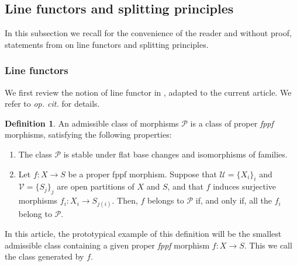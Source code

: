 \documentclass[11pt]{article}
\theoremstyle{plain}
\theoremstyle{definition}
\newtheorem{definition}[theorem]{Definition}
\newcommand{\Pcal}{\mathcal P}
\newcommand{\Ucal}{\mathcal U}
\newcommand{\Vcal}{\mathcal V}
\newcommand{\fppf}{\emph{fppf}\xspace}
\begin{document}
\subsection{Line functors and splitting principles}\label{subsubsec:line-functors}
In this subsection we recall for the convenience of the reader and without proof, statements from \cite[\S 2]{Eriksson-Freixas-Wentworth} on line functors and splitting principles.

\subsubsection{Line functors}
We first review the notion of line functor in \cite[Def.\,2.1]{Eriksson-Freixas-Wentworth}, adapted to the current article. We refer to \emph{op. cit.} for details.

\begin{definition}\label{def:admissible-class}
An admissible class of morphisms $\Pcal$ is a class of proper \fppf morphisms, satisfying the following properties:
\begin{enumerate}
\item[$(P_1)$] The class $\Pcal$ is stable under flat base changes and isomorphisms of families.
\item[$(P_2)$] Let $f\colon X\to S$ be a proper fppf morphism. Suppose that $\Ucal=\lbrace X_{i}\rbrace_{i}$ and $\Vcal=\lbrace S_{j}\rbrace_{j}$ are open partitions of $X$ and $S$, and that $f$ induces surjective morphisms $f_{i}\colon X_{i}\to S_{j(i)}$. Then, $f$ belongs to $\Pcal$ if, and only if, all the $f_{i}$ belong to $\Pcal$.
\end{enumerate}

\end{definition}
In this article, the prototypical example of this definition will be the smallest admissible class containing a given proper \fppf morphism $f\colon X\to S$. This we call the class generated by $f$.
\end{document}
